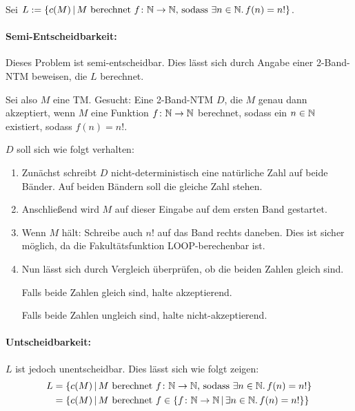 \begin{example}
	Sei $L := \{ c(M) \,|\, M \text{ berechnet } f \colon \mathbb{N} \rightarrow
	\mathbb{N} \text{, sodass } \exists n \in \mathbb{N}.\, f(n) = n! \}$.

	\paragraph{Semi-Entscheidbarkeit:}
	Dieses Problem ist semi-entscheidbar. Dies lässt sich durch Angabe einer
	2-Band-NTM beweisen, die $L$ berechnet.
	
	Sei also $M$ eine TM. Gesucht: Eine 2-Band-NTM $D$, die $M$ genau dann 
	akzeptiert, wenn $M$ eine Funktion $f \colon \mathbb{N} \rightarrow \mathbb{N}$ 
	berechnet, sodass ein $n \in \mathbb{N}$ existiert, sodass $f(n) = n!$.

	$D$ soll sich wie folgt verhalten:
	\begin{enumerate}
		\item
			Zunächst schreibt $D$ nicht-deterministisch eine
			natürliche Zahl auf beide Bänder. Auf beiden Bändern
			soll die gleiche Zahl stehen.
		\item
			Anschließend wird $M$ auf dieser Eingabe auf dem ersten
			Band gestartet.
		\item
			Wenn $M$ hält: Schreibe auch $n!$ auf das Band rechts
			daneben. Dies ist sicher möglich, da die
			Fakultätsfunktion LOOP-berechenbar ist.
		\item
			Nun lässt sich durch Vergleich überprüfen, ob die beiden
			Zahlen gleich sind.

			Falls beide Zahlen gleich sind, halte
			akzeptierend.

			Falls beide Zahlen ungleich sind, halte
			nicht-akzeptierend.
	\end{enumerate}
	\par

	\paragraph{Untscheidbarkeit:}
	$L$ ist jedoch unentscheidbar. Dies lässt sich wie folgt zeigen:
	\begin{align*}
		L
		& = \{ c(M) \,|\, M \text{ berechnet } f \colon \mathbb{N} \rightarrow
		\mathbb{N} \text{, sodass } \exists n \in \mathbb{N}.\, f(n) = n! \} \\
		& = \{ c(M) \,|\, M \text{ berechnet } f \in \{f \colon \mathbb{N}
		\rightarrow \mathbb{N} \,|\, \exists n \in \mathbb{N}.\, f(n) = n! \}\} \\
	\end{align*}


\end{example}
